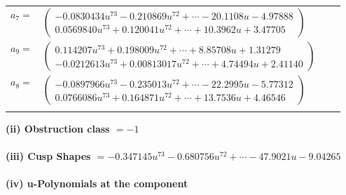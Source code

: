 \documentclass[1p]{elsarticle_modified}
\theoremstyle{definition}
\begin{document}
\begin{tabular}{m{7pt} m{180pt} m{7pt} m{180pt} }
\flushright $a_{7}=$&$\begin{pmatrix}-0.0830434 u^{73}-0.210869 u^{72}+\cdots-20.1108 u-4.97888\\0.0569840 u^{73}+0.120041 u^{72}+\cdots+10.3962 u+3.47705\end{pmatrix}$ \\
\flushright $a_{9}=$&$\begin{pmatrix}0.114207 u^{73}+0.198009 u^{72}+\cdots+8.85708 u+1.31279\\-0.0212613 u^{73}+0.00813017 u^{72}+\cdots+4.74494 u+2.41140\end{pmatrix}$ \\
\flushright $a_{8}=$&$\begin{pmatrix}-0.0897966 u^{73}-0.235013 u^{72}+\cdots-22.2995 u-5.77312\\0.0766086 u^{73}+0.164871 u^{72}+\cdots+13.7536 u+4.46546\end{pmatrix}$\\&\end{tabular}
\flushleft \textbf{(ii) Obstruction class $= -1$}\\~\\
\flushleft \textbf{(iii) Cusp Shapes $= -0.347145 u^{73}-0.680756 u^{72}+\cdots-47.9021 u-9.04265$}\\~\\
\newpage\renewcommand{\arraystretch}{1}
\flushleft \textbf{(iv) u-Polynomials at the component}\newline \\
\end{document}

